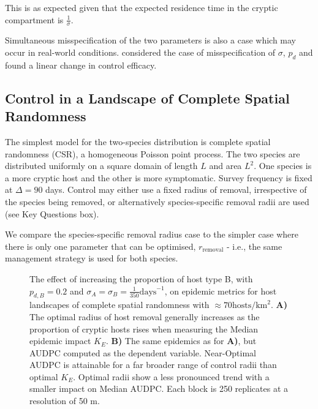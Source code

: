 \documentclass[prstpaper]{revtex4-2}
\begin{document}

This is as expected given that the expected residence time in the cryptic compartment is $\frac{1}{\sigma}$.

Simultaneous misspecification of the two parameters is also a case which may occur in real-world conditions. \cite{HyattTwynham2017} considered the case of misspecification of $\sigma$, $p_{d}$ and found a linear change in control efficacy. 


\subsection*{Control in a Landscape of Complete Spatial Randomness}

The simplest model for the two-species distribution is complete spatial randomness (CSR), a homogeneous Poisson point process. The two species are distributed uniformly on a square domain of length $L$ and area $L^2$. One species is a more cryptic host and the other is more symptomatic. Survey frequency is fixed at $\Delta = 90$ days. Control may either use a fixed radius of removal, irrespective of the species being removed, or alternatively species-specific removal radii are used (see Key Questions box). 

We compare the species-specific removal radius case to the simpler case where there is only one parameter that can be optimised, $r_{\mathrm{removal}}$ - i.e., the same management strategy is used for both species. 

\begin{figure}[hbt!]

\caption{\label{csr4kdeltapd} The effect of increasing the proportion of host type B, with $p_{d,B}  = 0.2 $ and $\sigma_{A} = \sigma_{B} = \frac{1}{350}  \mathrm{days}^{-1}$, on epidemic metrics for host landscapes of complete spatial randomness with $\approx 70  \mathrm{ hosts} / \mathrm{km}^2$. \textbf{A)} The optimal radius of host removal generally increases as the proportion of cryptic hosts rises when measuring the Median epidemic impact $K_E$. \textbf{B)} The same epidemics as for \textbf{A)}, but AUDPC computed as the dependent variable. Near-Optimal AUDPC is attainable for a far broader range of control radii than optimal $K_E$.  
Optimal radii show a less pronounced trend with a smaller impact on Median AUDPC. Each block is 250 replicates at a resolution of 50 m.}
\end{figure}
\end{document}
